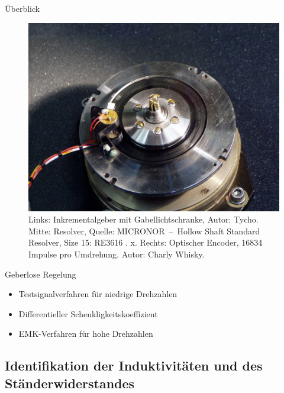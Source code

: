 \documentclass{beamer}
\begin{document}
\begin{frame}[plain]{Überblick}
\begin{figure}
\begin{minipage}{0.3\textwidth}
		\end{minipage}
		\begin{minipage}{0.3\textwidth}
			\includegraphics[width=\linewidth]{img/encoder}
		\end{minipage}
		\caption{Links: Inkrementalgeber mit Gabellichtschranke, Autor: Tycho. Mitte: Resolver, Quelle: MICRONOR~--~Hollow Shaft Standard Resolver, Size 15: RE3616 . x. Rechts: Optischer Encoder, 16834 Impulse pro Umdrehung. Autor: Charly Whisky.}
	\end{figure}
\end{frame}

\begin{frame}{Geberlose Regelung}
	\begin{itemize}
		\item Testsignalverfahren für niedrige Drehzahlen
		\item Differentieller Schenkligkeitskoeffizient
		\item EMK-Verfahren für hohe Drehzahlen
	\end{itemize}
\end{frame}

\subsection{Identifikation der Induktivitäten und des Ständerwiderstandes}
\end{document}
